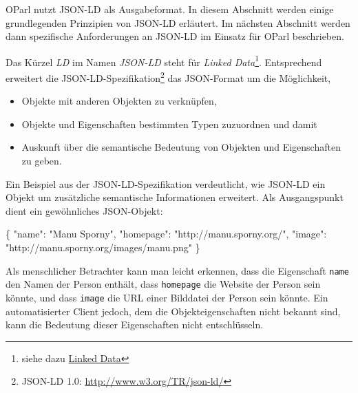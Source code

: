 \documentclass[,a4paper]{article}
\newenvironment{Shaded}{}{}
\newcommand{\DataTypeTok}[1]{\textcolor[rgb]{0.56,0.13,0.00}{{#1}}}
\newcommand{\StringTok}[1]{\textcolor[rgb]{0.25,0.44,0.63}{{#1}}}
\newcommand{\FunctionTok}[1]{\textcolor[rgb]{0.02,0.16,0.49}{{#1}}}
\begin{document}

OParl nutzt JSON-LD als Ausgabeformat. In diesem Abschnitt werden einige
grundlegenden Prinzipien von JSON-LD erläutert. Im nächsten Abschnitt
werden dann spezifische Anforderungen an JSON-LD im Einsatz für OParl
beschrieben.

Das Kürzel \emph{LD} im Namen \emph{JSON-LD} steht für \emph{Linked
Data}\footnote{siehe dazu \hyperref[linkedux5fdata]{Linked Data}}.
Entsprechend erweitert die JSON-LD-Spezifikation\footnote{JSON-LD 1.0:
  \url{http://www.w3.org/TR/json-ld/}} das JSON-Format um die
Möglichkeit,

\begin{itemize}
\itemsep1pt\parskip0pt
\item
  Objekte mit anderen Objekten zu verknüpfen,
\item
  Objekte und Eigenschaften bestimmten Typen zuzuordnen und damit
\item
  Auskunft über die semantische Bedeutung von Objekten und Eigenschaften
  zu geben.
\end{itemize}

Ein Beispiel aus der JSON-LD-Spezifikation verdeutlicht, wie JSON-LD ein
Objekt um zusätzliche semantische Informationen erweitert. Als
Ausgangspunkt dient ein gewöhnliches JSON-Objekt:

\begin{Shaded}
\begin{Highlighting}[]
\FunctionTok{\{}
  \DataTypeTok{"name"}\FunctionTok{:} \StringTok{"Manu Sporny"}\FunctionTok{,}
  \DataTypeTok{"homepage"}\FunctionTok{:} \StringTok{"http://manu.sporny.org/"}\FunctionTok{,}
  \DataTypeTok{"image"}\FunctionTok{:} \StringTok{"http://manu.sporny.org/images/manu.png"}
\FunctionTok{\}}
\end{Highlighting}
\end{Shaded}

Als menschlicher Betrachter kann man leicht erkennen, dass die
Eigenschaft \texttt{name} den Namen der Person enthält, dass
\texttt{homepage} die Website der Person sein könnte, und dass
\texttt{image} die URL einer Bilddatei der Person sein könnte. Ein
automatisierter Client jedoch, dem die Objekteigenschaften nicht bekannt
sind, kann die Bedeutung dieser Eigenschaften nicht entschlüsseln.
\end{document}

